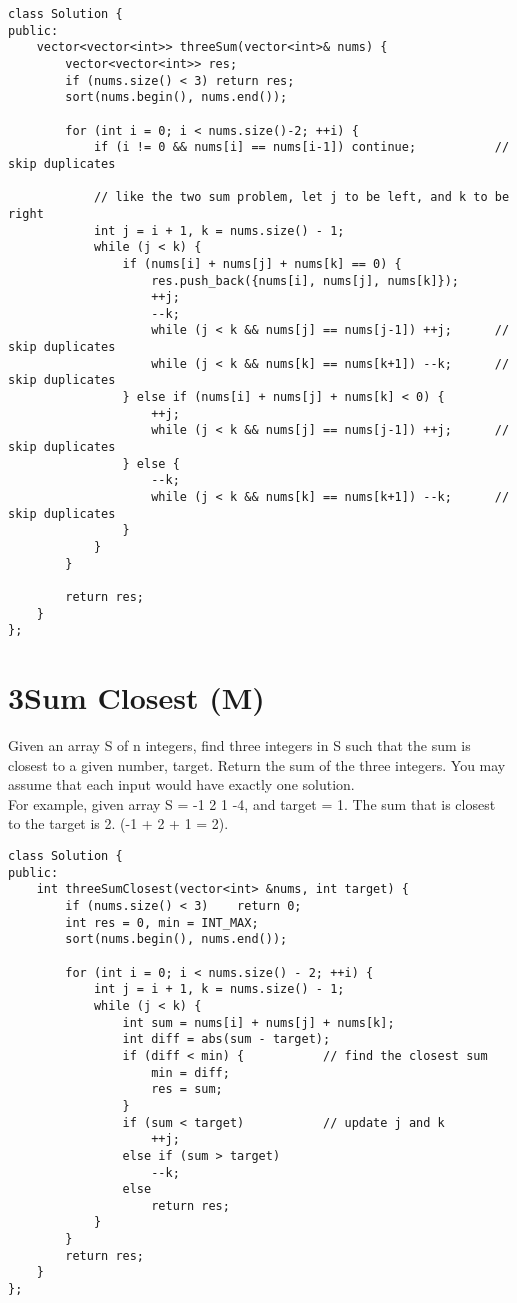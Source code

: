 \begin{lstlisting}
class Solution {
public:
    vector<vector<int>> threeSum(vector<int>& nums) {
        vector<vector<int>> res;
        if (nums.size() < 3) return res;
        sort(nums.begin(), nums.end());

        for (int i = 0; i < nums.size()-2; ++i) {
            if (i != 0 && nums[i] == nums[i-1]) continue;           // skip duplicates
            
            // like the two sum problem, let j to be left, and k to be right
            int j = i + 1, k = nums.size() - 1;                     
            while (j < k) {
                if (nums[i] + nums[j] + nums[k] == 0) {
                    res.push_back({nums[i], nums[j], nums[k]});
                    ++j;
                    --k;
                    while (j < k && nums[j] == nums[j-1]) ++j;      // skip duplicates
                    while (j < k && nums[k] == nums[k+1]) --k;      // skip duplicates
                } else if (nums[i] + nums[j] + nums[k] < 0) {
                    ++j;
                    while (j < k && nums[j] == nums[j-1]) ++j;      // skip duplicates
                } else {
                    --k;
                    while (j < k && nums[k] == nums[k+1]) --k;      // skip duplicates
                }
            }
        }
        
        return res;
    }
};
\end{lstlisting}


\section{3Sum Closest (M)}
Given an array S of n integers, find three integers in S such that the sum is closest to a given number, target. Return the sum of the three integers. You may assume that each input would have exactly one solution. \\

For example, given array S = {-1 2 1 -4}, and target = 1. The sum that is closest to the target is 2. (-1 + 2 + 1 = 2).\\

\begin{lstlisting}
class Solution {
public:
    int threeSumClosest(vector<int> &nums, int target) {
        if (nums.size() < 3)    return 0;
        int res = 0, min = INT_MAX;
        sort(nums.begin(), nums.end());
        
        for (int i = 0; i < nums.size() - 2; ++i) {
            int j = i + 1, k = nums.size() - 1;
            while (j < k) {
                int sum = nums[i] + nums[j] + nums[k];
                int diff = abs(sum - target);
                if (diff < min) {           // find the closest sum
                    min = diff;
                    res = sum;
                }
                if (sum < target)           // update j and k
                    ++j;
                else if (sum > target)
                    --k;
                else
                    return res;
            }
        }
        return res;
    }
};
\end{lstlisting}


